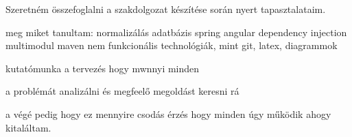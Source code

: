 Szeretném összefoglalni a szakdolgozat készítése során nyert tapasztalataim.



meg miket tanultam:
normalizálás adatbázis
spring  angular
dependency injection
multimodul maven
nem funkcionális technológiák, mint git, latex,  diagrammok 

kutatómunka a tervezés hogy mwnnyi minden

a problémát analizálni és megfeelő megoldást keresni rá

a végé pedig hogy ez mennyire csodás érzés hogy minden úgy működik ahogy kitaláltam.


